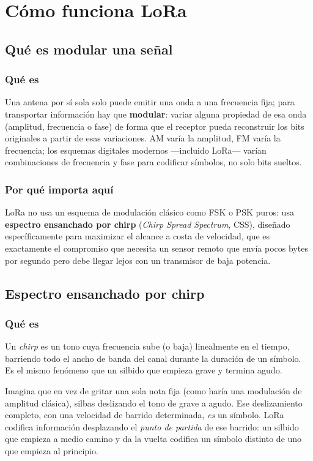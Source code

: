 \part{Cómo funciona LoRa}
\label{part:lora}

\chapter{Qué es modular una señal}

\section{Qué es}

Una antena por sí sola solo puede emitir una onda a una frecuencia fija; para transportar
información hay que \textbf{modular}: variar alguna propiedad de esa onda (amplitud,
frecuencia o fase) de forma que el receptor pueda reconstruir los bits originales a partir de
esas variaciones. AM varía la amplitud, FM varía la frecuencia; los esquemas digitales modernos
—incluido LoRa— varían combinaciones de frecuencia y fase para codificar símbolos, no solo bits
sueltos.

\section{Por qué importa aquí}

LoRa no usa un esquema de modulación clásico como FSK o PSK puros: usa \textbf{espectro
ensanchado por chirp} (\emph{Chirp Spread Spectrum}, CSS), diseñado específicamente para
maximizar el alcance a costa de velocidad, que es exactamente el compromiso que necesita un
sensor remoto que envía pocos bytes por segundo pero debe llegar lejos con un transmisor de
baja potencia.

\chapter{Espectro ensanchado por chirp}

\section{Qué es}

Un \emph{chirp} es un tono cuya frecuencia sube (o baja) linealmente en el tiempo, barriendo
todo el ancho de banda del canal durante la duración de un símbolo. Es el mismo fenómeno que un
silbido que empieza grave y termina agudo.

\begin{nota}[title={Analogía}]
Imagina que en vez de gritar una sola nota fija (como haría una modulación de amplitud
clásica), silbas deslizando el tono de grave a agudo. Ese deslizamiento completo, con una
velocidad de barrido determinada, \emph{es} un símbolo. LoRa codifica información desplazando
el \emph{punto de partida} de ese barrido: un silbido que empieza a medio camino y da la vuelta
codifica un símbolo distinto de uno que empieza al principio.
\end{nota}

